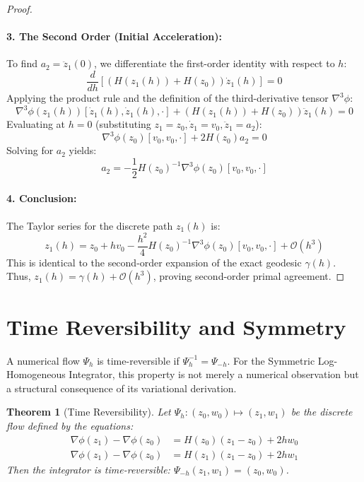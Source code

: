 \documentclass[11pt,a4paper]{article}
\newtheorem{theorem}{Theorem}
\begin{document}
\begin{proof}
\paragraph{3. The Second Order (Initial Acceleration):}
To find $a_2 = \ddot{z}_1(0)$, we differentiate the first-order identity with respect to $h$:
\begin{equation}
    \frac{d}{dh} \left[ (H(z_1(h)) + H(z_0)) \dot{z}_1(h) \right] = 0
\end{equation}
Applying the product rule and the definition of the third-derivative tensor $\nabla^3 \phi$:
\begin{equation}
    \nabla^3 \phi(z_1(h))[\dot{z}_1(h), \dot{z}_1(h), \cdot] + (H(z_1(h)) + H(z_0)) \ddot{z}_1(h) = 0
\end{equation}
Evaluating at $h=0$ (substituting $z_1 = z_0, \dot{z}_1 = v_0, \ddot{z}_1 = a_2$):
\begin{equation}
    \nabla^3 \phi(z_0)[v_0, v_0, \cdot] + 2H(z_0) a_2 = 0
\end{equation}
Solving for $a_2$ yields:
\begin{equation}
    a_2 = -\frac{1}{2} H(z_0)^{-1} \nabla^3 \phi(z_0)[v_0, v_0, \cdot]
\end{equation}

\paragraph{4. Conclusion:}
The Taylor series for the discrete path $z_1(h)$ is:
\begin{equation}
    z_1(h) = z_0 + h v_0 - \frac{h^2}{4} H(z_0)^{-1} \nabla^3 \phi(z_0)[v_0, v_0, \cdot] + \mathcal{O}(h^3)
\end{equation}
This is identical to the second-order expansion of the exact geodesic $\gamma(h)$. Thus, $z_1(h) = \gamma(h) + \mathcal{O}(h^3)$, proving second-order primal agreement.
\end{proof}



\section{Time Reversibility and Symmetry}

A numerical flow $\Psi_h$ is time-reversible if $\Psi_h^{-1} = \Psi_{-h}$. For the Symmetric Log-Homogeneous Integrator, this property is not merely a numerical observation but a structural consequence of its variational derivation.

\begin{theorem}[Time Reversibility]
Let $\Psi_h: (z_0, w_0) \mapsto (z_1, w_1)$ be the discrete flow defined by the equations:
\begin{align}
    \nabla \phi(z_1) - \nabla \phi(z_0) &= H(z_0)(z_1 - z_0) + 2h w_0 \label{eq:forward_z} \\
    \nabla \phi(z_1) - \nabla \phi(z_0) &= H(z_1)(z_1 - z_0) + 2h w_1 \label{eq:forward_w}
\end{align}
Then the integrator is time-reversible: $\Psi_{-h}(z_1, w_1) = (z_0, w_0)$.
\end{theorem}
\end{document}
